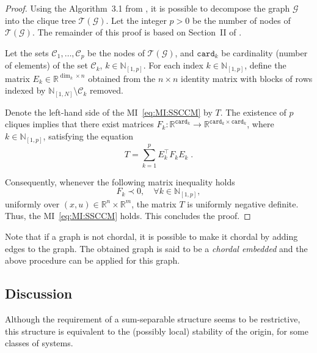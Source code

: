 \documentclass[10pt,twocolumn,twoside]{IEEEtran}
\newcounter{para}
\newcommand\mypara{\par}
\theoremstyle{plain}
\theoremstyle{definition}
\theoremstyle{remark}
\begin{document}
\begin{proof}
	Using the Algorithm~3.1 from \cite{VandenbergheAndersen2015}, it is possible to decompose the graph $\mathscr{G}$ into the clique tree $\mathscr{T}(\mathscr{G})$. Let the integer $p>0$ be the number of nodes of $\mathscr{T}(\mathscr{G})$. The remainder of this proof is based on Section~II of \cite{PakazadHanssonAndersenEtAl2015}.
	
\mypara 	Let the sets $\mathscr{C}_1,\ldots,\mathscr{C}_p$ be the nodes of $\mathscr{T}(\mathscr{G})$, and $\mathbin{\mathtt{card}}_k$ be cardinality (number of elements) of the set $\mathscr{C}_k$, $k\in\mathbb{N}_{[1,p]}$. For each index $k\in\mathbb{N}_{[1,p]}$, define the matrix $E_k\in\mathbb{R}^{\dim_k\times n}$ obtained from the $n\times n$ identity matrix with blocks of rows indexed by $\mathbb{N}_{[1,N]}\setminus \mathscr{C}_k$ removed.
	
\mypara    Denote the left-hand side of the MI~\eqref{eq:MI:SSCCM} by $T$. The existence of $p$ cliques implies that there exist matrices $F_k:\mathbb{R}^{\mathbin{\mathtt{card}}_k}\to\mathbb{R}^{\mathbin{\mathtt{card}}_k\times \mathbin{\mathtt{card}}_k}$, where $k\in\mathbb{N}_{[1,p]}$, satisfying the equation
   \begin{equation*}
   	 T=\sum_{k=1}^p E_k^\top F_k E_k\;.
  	\end{equation*}
  	
\mypara Consequently, whenever the following matrix inequality holds 
  	\begin{equation}\label{eq:MIF}
  		F_k\prec0,\quad\forall k\in\mathbb{N}_{[1,p]},
	\end{equation}
	uniformly over $(x,u)\in\mathbb{R}^n\times\mathbb{R}^m$, the matrix $T$ is uniformly negative definite. Thus, the MI~\eqref{eq:MI:SSCCM} holds. This concludes the proof.
\end{proof}

\mypara Note that if a graph is not chordal, it is possible to make it chordal by adding edges to the graph. The obtained graph is said to be a \emph{chordal embedded} and the above procedure can be applied for this graph.

\subsection{Discussion}

\mypara Although the requirement of a sum-separable structure seems to be restrictive, this structure is equivalent to the (possibly local) stability of the origin, for some classes of systems.
\end{document}
